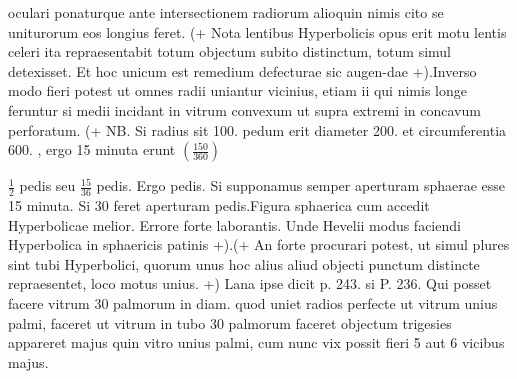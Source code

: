 oculari\protect{} ponaturque ante intersectionem radiorum alioquin nimis cito se uniturorum eos longius feret. (+ Nota  lentibus\protect{} Hyperbolicis opus erit motu lentis\protect{} celeri ita repraesentabit totum objectum subito distinctum,  totum simul detexisset. Et hoc unicum est remedium defecturae sic augen-\linebreak dae +).\pend \pstart Inverso modo fieri potest ut omnes radii uniantur vicinius, etiam ii qui nimis longe feruntur si medii incidant in vitrum convexum ut supra extremi in concavum perforatum. (+ NB. Si radius sit 100. pedum erit diameter 200. et circumferentia 600. , ergo 15 minuta erunt $\displaystyle(\frac{150}{360})$\rule[-4mm]{0mm}{10mm} $\displaystyle\frac{1}{2}$ pedis seu $\displaystyle \frac{15}{36}$ pedis. Ergo  pedis. Si supponamus semper aperturam sphaerae esse 15 minuta. Si 30 feret aperturam pedis.\pend \pstart Figura sphaerica cum accedit Hyperbolicae melior. Errore forte laborantis. Unde Hevelii\protect{} modus faciendi Hyperbolica in sphaericis patinis +).\pend \pstart (+ An forte procurari potest, ut simul plures sint tubi Hyperbolici, quorum unus hoc alius aliud objecti punctum distincte repraesentet, loco motus \linebreak unius. +) \pend \pstart Lana \protect{} ipse dicit p. 243. si  \pend \pstart P. 236.  Qui posset facere vitrum 30 palmorum in diam. quod uniet radios perfecte ut vitrum unius palmi, faceret ut vitrum in tubo 30 palmorum faceret objectum trigesies appareret majus quin vitro unius palmi, cum nunc vix possit fieri 5 aut 6 vicibus majus.\pend \pstart 